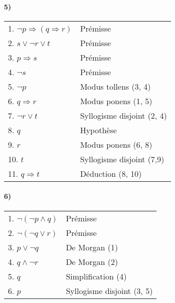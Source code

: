     \paragraph{5)}
    \begin{center}
    \begin{tabular}{|l|l|}
    \hline
    1. $\lnot p \Rightarrow (q \Rightarrow r)$ & Prémisse \\
    2. $s \lor \lnot r \lor t$ & Prémisse \\
    3. $p \Rightarrow s$ & Prémisse \\
    4. $\lnot s$ & Prémisse \\
    5. $\lnot p$ & Modus tollens (3, 4) \\ 
    6. $q \Rightarrow r$ & Modus ponens (1, 5) \\
    7. $\lnot r \lor t$ & Syllogisme disjoint (2, 4) \\
    \hspace{0.5cm} 8. $q$ & Hypothèse \\
    \hspace{0.5cm} 9. $r$ & Modus ponens (6, 8) \\
    \hspace{0.5cm} 10. $t$ & Syllogisme disjoint (7,9) \\
    11. $q \Rightarrow t$ & Déduction (8, 10) \\
    \hline
    \end{tabular}
    \end{center}
    
    \paragraph{6)}
    \begin{center}
    \begin{tabular}{|l|l|}
    \hline
    1. $\lnot ( \lnot p \land q)$ & Prémisse \\
    2. $\lnot ( \lnot q \lor r)$ & Prémisse \\
    3. $p \lor \lnot q$ & De Morgan (1) \\
    4. $q \land \lnot r$ & De Morgan (2) \\
    5. $q$ & Simplification (4) \\
    6. $p$ & Syllogisme disjoint (3, 5) \\
    \hline
    \end{tabular}
    \end{center}
    
